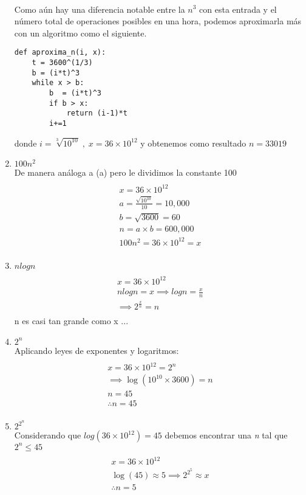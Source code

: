 \documentclass[12pt]{article}
\begin{document}
\begin{enumerate}[label=(\alph*)]
\begin{multline*}
  \end{multline*}
  Como aún hay una diferencia notable entre la $n^3$ con esta entrada y el número total de operaciones posibles en una hora, podemos aproximarla más con un algoritmo como el siguiente.
\begin{verbatim}
def aproxima_n(i, x):
    t = 3600^(1/3) 
    b = (i*t)^3
    while x > b:
        b  = (i*t)^3
        if b > x:
            return (i-1)*t
        i+=1
\end{verbatim}
  donde $i = \sqrt[3]{10^{10}} \;,\; x=36 \times 10^{12}$ y  obtenemos como resultado $n = 33019$
\item $100n^2$ \\
  De manera análoga a (a) pero le dividimos la constante 100 
  \begin{multline*}
    \\x = 36 \times 10^{12}\\
    a = \frac{\sqrt{10^{10}}}{10} = 10,000\\
    b = \sqrt{3600}= 60\\
    n = a \times b = 600,000\\
    100n^2 = 36 \times 10^{12} = x\\   
  \end{multline*}

\item $n log n$
  \begin{multline*}
    \\ x = 36 \times 10^{12}\\
    n log n = x \implies log n = \frac{x}{n}\\
    \implies 2^{\frac{x}{n}} = n \\
  \end{multline*}
  n es casi tan grande como x ...%
\item $2^n$\\
  Aplicando leyes de exponentes y logaritmos:
  \begin{multline*}
    \\ x  =  36 \times 10^{12}  =  2^n \\
    \implies \log({10^{10} \times 3600} ) =  n\\
    n =  45\\
    \therefore n = 45\\
  \end{multline*}
\item $2^{2^{n}}$ \\
  Considerando que $log(36 \times 10^{12}) = 45$ debemos encontrar una \textit{n} tal que $2^n \leq 45$\\
  \begin{multline*}
    \\ x = 36 \times 10^{12}\\
    \log(45) \approx 5
    \implies 2^{2^{5}} \approx x \\
    \therefore n = 5 \\
  \end{multline*}
\end{enumerate}
\end{document}
